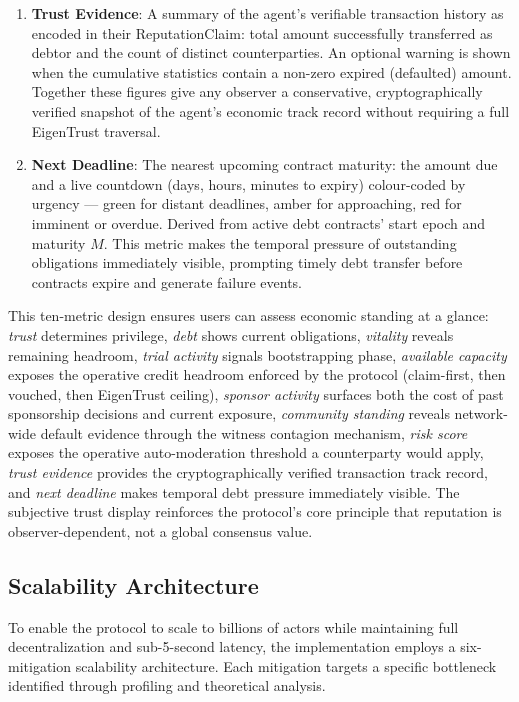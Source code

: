\documentclass[11pt]{article}
\begin{document}
\begin{enumerate}
    \item \textbf{Trust Evidence}: A summary of the agent's verifiable transaction history as encoded in their ReputationClaim: total amount successfully transferred as debtor and the count of distinct counterparties. An optional warning is shown when the cumulative statistics contain a non-zero expired (defaulted) amount. Together these figures give any observer a conservative, cryptographically verified snapshot of the agent's economic track record without requiring a full EigenTrust traversal.

    \item \textbf{Next Deadline}: The nearest upcoming contract maturity: the amount due and a live countdown (days, hours, minutes to expiry) colour-coded by urgency --- green for distant deadlines, amber for approaching, red for imminent or overdue. Derived from active debt contracts' start epoch and maturity $M$. This metric makes the temporal pressure of outstanding obligations immediately visible, prompting timely debt transfer before contracts expire and generate failure events.
\end{enumerate}

This ten-metric design ensures users can assess economic standing at a glance: \emph{trust} determines privilege, \emph{debt} shows current obligations, \emph{vitality} reveals remaining headroom, \emph{trial activity} signals bootstrapping phase, \emph{available capacity} exposes the operative credit headroom enforced by the protocol (claim-first, then vouched, then EigenTrust ceiling), \emph{sponsor activity} surfaces both the cost of past sponsorship decisions and current exposure, \emph{community standing} reveals network-wide default evidence through the witness contagion mechanism, \emph{risk score} exposes the operative auto-moderation threshold a counterparty would apply, \emph{trust evidence} provides the cryptographically verified transaction track record, and \emph{next deadline} makes temporal debt pressure immediately visible. The subjective trust display reinforces the protocol's core principle that reputation is observer-dependent, not a global consensus value.

\subsection{Scalability Architecture}

To enable the protocol to scale to billions of actors while maintaining full decentralization and sub-5-second latency, the implementation employs a six-mitigation scalability architecture. Each mitigation targets a specific bottleneck identified through profiling and theoretical analysis.
\end{document}
